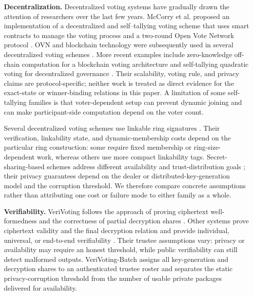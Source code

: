 \documentclass[pdflatex,sn-mathphys-num]{sn-jnl}%
\theoremstyle{thmstyleone}%
\theoremstyle{thmstyletwo}%
\theoremstyle{thmstylethree}%
\begin{document}
\textbf{Decentralization.} Decentralized voting systems have gradually drawn the attention of researchers over the last few years. McCorry et al. \cite{bib114} proposed an implementation of a decentralized and self--tallying voting scheme that uses smart contracts to manage the voting process and a two-round Open Vote Network protocol \cite{bib5}. OVN and blockchain technology were subsequently used in several decentralized voting schemes \cite{bib56,bib57,bib58,bib114,bib115,bib116,bib117,bib118,bib119,bib120}. More recent examples include zero-knowledge off-chain computation for a blockchain voting architecture \cite{bib138} and self-tallying quadratic voting for decentralized governance \cite{bib137}. Their scalability, voting rule, and privacy claims are protocol-specific; neither work is treated as direct evidence for the exact-state or winner-binding relations in this paper. A limitation of some self-tallying families is that voter-dependent setup can prevent dynamic joining and can make participant-side computation depend on the voter count.

Several decentralized voting schemes use linkable ring signatures \cite{bib2,bib60,bib61,bib62,bib63,bib64,bib65}. Their verification, linkability state, and dynamic-membership costs depend on the particular ring construction: some require fixed membership or ring-size-dependent work, whereas others use more compact linkability tags. Secret-sharing-based schemes address different availability and trust-distribution goals \cite{bib3,bib66,bib67,bib68,bib69,bib70,bib71}; their privacy guarantees depend on the dealer or distributed-key-generation model and the corruption threshold. We therefore compare concrete assumptions rather than attributing one cost or failure mode to either family as a whole.

\textbf{Verifiability.} VeriVoting follows the approach of proving ciphertext well-formedness and the correctness of partial decryption shares \cite{bib72}. Other systems prove ciphertext validity and the final decryption relation and provide individual, universal, or end-to-end verifiability \cite{bib73,bib74,bib75,bib76,bib77,bib78,bib79,bib80,bib81,bib82}. Their trustee assumptions vary: privacy or availability may require an honest threshold, while public verifiability can still detect malformed outputs. VeriVoting-Batch assigns all key-generation and decryption shares to an authenticated trustee roster and separates the static privacy-corruption threshold from the number of usable private packages delivered for availability.
\end{document}
